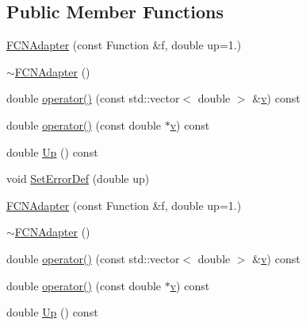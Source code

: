 \subsection*{Public Member Functions}
\begin{DoxyCompactItemize}
\item 
\mbox{\hyperlink{classROOT_1_1Minuit2_1_1FCNAdapter_a0cd70aee01a37c53792062b4118588dc}{F\+C\+N\+Adapter}} (const Function \&f, double up=1.)
\item 
\mbox{\hyperlink{classROOT_1_1Minuit2_1_1FCNAdapter_a6d8b1c24b52ec333fca9cc854533a777}{$\sim$\+F\+C\+N\+Adapter}} ()
\item 
double \mbox{\hyperlink{classROOT_1_1Minuit2_1_1FCNAdapter_a3d400764a6828594b68a00b905d450b2}{operator()}} (const std\+::vector$<$ double $>$ \&\mbox{\hyperlink{adat__devel_2lib_2hadron_2hadron__timeslice_8cc_a716fc87f5e814be3ceee2405ed6ff22a}{v}}) const
\item 
double \mbox{\hyperlink{classROOT_1_1Minuit2_1_1FCNAdapter_a9321402d626f4bdfbdbef3b63d452daf}{operator()}} (const double $\ast$\mbox{\hyperlink{adat__devel_2lib_2hadron_2hadron__timeslice_8cc_a716fc87f5e814be3ceee2405ed6ff22a}{v}}) const
\item 
double \mbox{\hyperlink{classROOT_1_1Minuit2_1_1FCNAdapter_a3bcb29efda3b97c17bb17512c1629365}{Up}} () const
\item 
void \mbox{\hyperlink{classROOT_1_1Minuit2_1_1FCNAdapter_ad87419db3f1d4764497f52487fef6fc8}{Set\+Error\+Def}} (double up)
\item 
\mbox{\hyperlink{classROOT_1_1Minuit2_1_1FCNAdapter_a0cd70aee01a37c53792062b4118588dc}{F\+C\+N\+Adapter}} (const Function \&f, double up=1.)
\item 
\mbox{\hyperlink{classROOT_1_1Minuit2_1_1FCNAdapter_a6d8b1c24b52ec333fca9cc854533a777}{$\sim$\+F\+C\+N\+Adapter}} ()
\item 
double \mbox{\hyperlink{classROOT_1_1Minuit2_1_1FCNAdapter_a3d400764a6828594b68a00b905d450b2}{operator()}} (const std\+::vector$<$ double $>$ \&\mbox{\hyperlink{adat__devel_2lib_2hadron_2hadron__timeslice_8cc_a716fc87f5e814be3ceee2405ed6ff22a}{v}}) const
\item 
double \mbox{\hyperlink{classROOT_1_1Minuit2_1_1FCNAdapter_a9321402d626f4bdfbdbef3b63d452daf}{operator()}} (const double $\ast$\mbox{\hyperlink{adat__devel_2lib_2hadron_2hadron__timeslice_8cc_a716fc87f5e814be3ceee2405ed6ff22a}{v}}) const
\item 
double \mbox{\hyperlink{classROOT_1_1Minuit2_1_1FCNAdapter_a3bcb29efda3b97c17bb17512c1629365}{Up}} () const

\end{DoxyCompactItemize}
